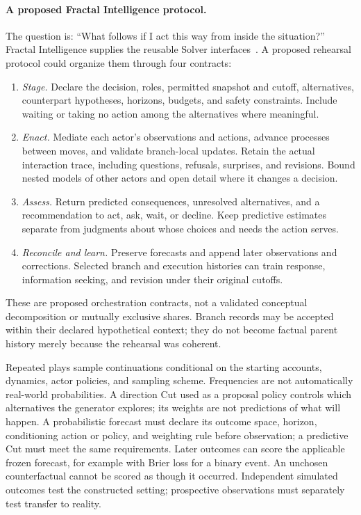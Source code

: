 \documentclass[10pt]{article}
\begin{document}
\paragraph{A proposed Fractal Intelligence protocol.}
The question is: ``What follows if I act this way from inside the situation?''
Fractal Intelligence supplies the reusable Solver
interfaces~\cite{westerbergFractal2026}. A proposed rehearsal protocol could
organize them through four contracts:
\begin{enumerate}[leftmargin=1.6em,itemsep=2pt,topsep=3pt]
\item \emph{Stage.} Declare the decision, roles, permitted snapshot and cutoff,
alternatives, counterpart hypotheses, horizons, budgets, and safety constraints.
Include waiting or taking no action among the alternatives where meaningful.
\item \emph{Enact.} Mediate each actor's observations and actions, advance
processes between moves, and validate branch-local updates. Retain the actual
interaction trace, including questions, refusals, surprises, and revisions.
Bound nested models of other actors and open detail where it changes a decision.
\item \emph{Assess.} Return predicted consequences, unresolved alternatives,
and a recommendation to act, ask, wait, or decline. Keep predictive estimates
separate from judgments about whose choices and needs the action serves.
\item \emph{Reconcile and learn.} Preserve forecasts and append later
observations and corrections. Selected branch and execution histories can
train response, information seeking, and revision under their original cutoffs.
\end{enumerate}
These are proposed orchestration contracts, not a validated conceptual
decomposition or mutually exclusive shares. Branch records may be accepted
within their declared hypothetical context; they do not become factual parent
history merely because the rehearsal was coherent.

Repeated plays sample continuations conditional on the starting accounts,
dynamics, actor policies, and sampling scheme. Frequencies are not automatically
real-world probabilities. A direction Cut used as a proposal policy controls
which alternatives the generator explores; its weights are not predictions of
what will happen. A probabilistic forecast must declare its outcome
space, horizon, conditioning action or policy, and weighting rule before
observation; a predictive Cut must meet the same requirements. Later outcomes
can score the applicable frozen forecast, for example with Brier loss for a
binary event. An unchosen counterfactual cannot be scored as though it occurred.
Independent simulated outcomes test the constructed setting; prospective
observations must separately test transfer to reality.
\end{document}
